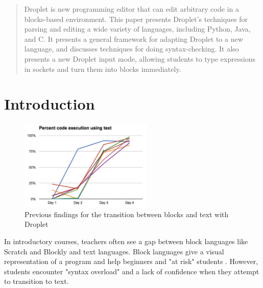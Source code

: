 \documentclass[conference]{IEEEtran}
\begin{document}
\begin{abstract}
Droplet is new programming editor that can edit arbitrary code in a blocks-based environment. This paper presents Droplet's techniques for parsing and editing a wide variety of languages, including Python, Java, and C. It presents a general framework for adapting Droplet to a new language, and discusses techniques for doing syntax-checking. It also presents a new Droplet input mode, allowing students to type expressions in sockets and turn them into blocks immediately.

\end{abstract}





%
\IEEEpeerreviewmaketitle

\section{Introduction}
\begin{figure}[!t]
\centering
\includegraphics[width=2.5in]{textgraph.png}
\caption{Previous findings for the transition between blocks and text with Droplet}
\label{textgraph}
\end{figure}

In introductory courses, teachers often see a gap between block languages like Scratch and Blockly and text languages. Block languages give a visual representation of a program and help beginners and "at risk" students \cite{Moskal}. However, students encounter "syntax overload" \cite{Powers} and a lack of confidence \cite{Lewis} when they attempt to transition to text.
\end{document}
